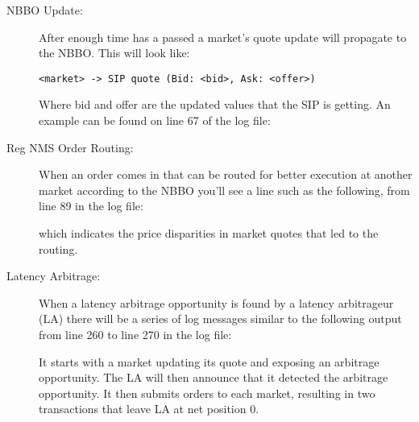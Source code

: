 \documentclass[11pt]{article}
\newcommand{\logfile}{../simulations_test_0_0_2014-05-12-13-36-04.txt}
\begin{document}
\begin{description}
\item[NBBO Update:] After enough time has a passed a market's quote update will propagate to the NBBO. This will look like:

\begin{verbatim}
<market> -> SIP quote (Bid: <bid>, Ask: <offer>)
\end{verbatim}

Where bid and offer are the updated values that the SIP is getting. An example can be found on line 67 of the log file:



\item[Reg NMS Order Routing:] When an order comes in that can be routed for better execution at another market according to the NBBO you'll see a line such as the following, from line 89 in the log file:

  

  which indicates the price disparities in market quotes that led to the routing.

\item[Latency Arbitrage:] When a latency arbitrage opportunity is found by a latency arbitrageur (LA) there will be a series of log messages similar to the following output from line 260 to line 270 in the log file:

  

  It starts with a market updating its quote and exposing an arbitrage
  opportunity. The LA will then announce that it detected the arbitrage opportunity. It then submits orders to each market, resulting in two transactions that leave LA at net position 0.

\end{description}
\end{document}
